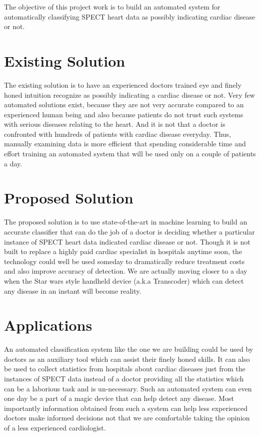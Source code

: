 \documentclass[11pt,a4paper]{report}
\begin{document}
{The objective of this project work is to build an automated system for automatically classifying SPECT heart data as possibly indicating cardiac disease or not.\\  

\section{Existing Solution}

The existing solution is to have an experienced doctors trained eye and finely honed intuition recognize as possibly indicating a cardiac disease or not. Very few automated solutions exist, because they are not very accurate compared to an experienced human being and also because patients do not trust such systems with serious diseases relating to the heart. And it is not that a doctor is confronted with hundreds of patients with cardiac disease everyday. Thus, manually examining data is more efficient that spending considerable time and effort training an automated system that will be used only on a couple of patients a day.\\

\section{Proposed Solution}

The proposed solution is to use state-of-the-art in machine learning to build an accurate classifier that can do the job of a doctor is deciding whether a particular instance of SPECT heart data indicated cardiac disease or not. Though it is not built to replace a highly paid cardiac specialist in hospitals anytime soon, the technology could well be used someday to dramatically reduce treatment costs and also improve accuracy of detection. We are actually moving closer to a day when the Star wars style handheld device (a.k.a Transcoder) which can detect any disease in an instant will become reality.\\


\section{Applications}

An automated classification system like the one we are building could be used by doctors as an auxiliary tool which can assist their finely honed skills. It can also be used to collect statistics from hospitals about cardiac diseases just from the instances of SPECT data instead of a doctor providing all the statistics which can be a laborious task and is un-necessary. Such an automated system can even one day be a part of a magic device that can help detect any disease. Most importantly information obtained from such a system can help less experienced doctors make informed decisions not that we are comfortable taking the opinion of a less experienced cardiologist.\\

}
\end{document}
